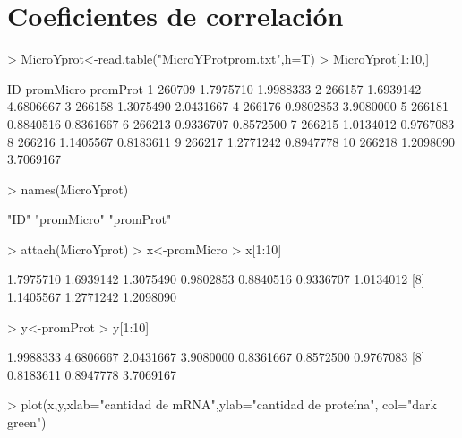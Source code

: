 \documentclass[12pt]{article}
\begin{document}
  \section*{Coeficientes de correlación}
  
\begin{Schunk}
\begin{Sinput}
> MicroYprot<-read.table("MicroYProtprom.txt",h=T)
> MicroYprot[1:10,]
\end{Sinput}
\begin{Soutput}
       ID promMicro  promProt
1  260709 1.7975710 1.9988333
2  266157 1.6939142 4.6806667
3  266158 1.3075490 2.0431667
4  266176 0.9802853 3.9080000
5  266181 0.8840516 0.8361667
6  266213 0.9336707 0.8572500
7  266215 1.0134012 0.9767083
8  266216 1.1405567 0.8183611
9  266217 1.2771242 0.8947778
10 266218 1.2098090 3.7069167
\end{Soutput}
\begin{Sinput}
> names(MicroYprot)
\end{Sinput}
\begin{Soutput}
[1] "ID"        "promMicro" "promProt" 
\end{Soutput}
\begin{Sinput}
> attach(MicroYprot)
> x<-promMicro
> x[1:10]
\end{Sinput}
\begin{Soutput}
 [1] 1.7975710 1.6939142 1.3075490 0.9802853 0.8840516 0.9336707 1.0134012
 [8] 1.1405567 1.2771242 1.2098090
\end{Soutput}
\begin{Sinput}
> y<-promProt
> y[1:10]
\end{Sinput}
\begin{Soutput}
 [1] 1.9988333 4.6806667 2.0431667 3.9080000 0.8361667 0.8572500 0.9767083
 [8] 0.8183611 0.8947778 3.7069167
\end{Soutput}
\end{Schunk}
\begin{Schunk}
\begin{Sinput}
> plot(x,y,xlab="cantidad de mRNA",ylab="cantidad de proteína", col="dark green")
\end{Sinput}
\end{Schunk}
\end{document}
